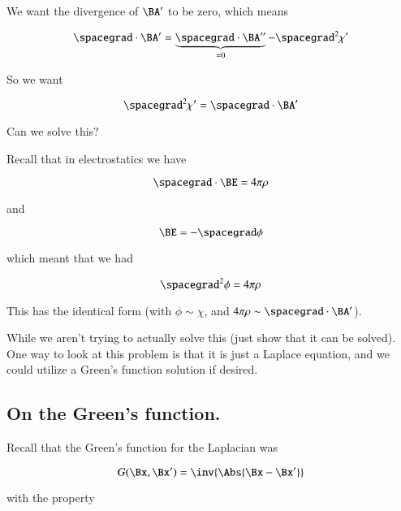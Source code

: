 We want the divergence of $\BA'$ to be zero, which means

\begin{equation}\label{eqn:relativisticElectrodynamicsL14:210}
\spacegrad \cdot \BA' = \underbrace{\spacegrad \cdot \BA''}_{=0} - \spacegrad^2 \chi'
\end{equation}

So we want

\begin{equation}\label{eqn:relativisticElectrodynamicsL14:230}
\spacegrad^2 \chi' = \spacegrad \cdot \BA'
\end{equation}

Can we solve this?

Recall that in electrostatics we have

\begin{equation}\label{eqn:relativisticElectrodynamicsL14:250}
\spacegrad \cdot \BE = 4 \pi \rho
\end{equation}

and 

\begin{equation}\label{eqn:relativisticElectrodynamicsL14:270}
\BE = -\spacegrad \phi
\end{equation}

which meant that we had 

\begin{equation}\label{eqn:relativisticElectrodynamicsL14:290}
\spacegrad^2 \phi = 4 \pi \rho
\end{equation}

This has the identical form (with $\phi \sim \chi$, and $4 \pi \rho \sim \spacegrad \cdot \BA'$).

While we aren't trying to actually solve this (just show that it can be solved).  One way to look at this problem is that it is just a Laplace equation, and we could utilize a Green's function solution if desired.

\subsection{On the Green's function.}

Recall that the Green's function for the Laplacian was 

\begin{equation}\label{eqn:relativisticElectrodynamicsL14:292}
G(\Bx, \Bx') = \inv{\Abs{\Bx - \Bx'}}
\end{equation}

with the property 

